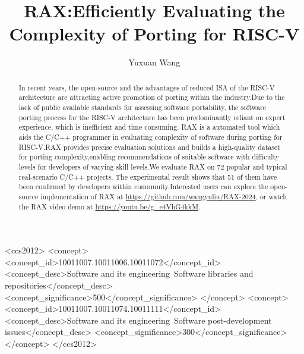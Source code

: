 \documentclass[sigconf,screen,review,anonymous]{acmart}
\begin{document}
\title{RAX:Efficiently Evaluating the Complexity of Porting for RISC-V}

\author{Yuxuan Wang}

\renewcommand{\shortauthors}{Yuxuan et al.}

\begin{abstract}
  In recent years, the open-source and the advantages of reduced ISA of the RISC-V architecture are attracting active promotion of porting within the industry.Due to the lack of public available standards for assessing software portability, the software porting process for the RISC-V architecture has been predominantly reliant on expert experience, which is inefficient and time consuming. RAX is a automated tool which aids the C/C++ programmer in evaluating  complexity of software during porting for RISC-V.RAX provides precise evaluation solutions and builds a high-quality dataset for porting complexity,enabling recommendations of suitable software with difficulty levels for developers of varying skill levels.We evaluate RAX on 72 popular and typical real-scenario C/C++ projects. The experimental result shows that 51 of them have been confirmed by developers within community.Interested users can explore the open-source implementation of RAX at \href{https://github.com/wangyuliu/RAX-2024}{https://github.com/wangyuliu/RAX-2024}, or watch the RAX video demo at \href{https://youtu.be/g_e4VhG4kkM}{https://youtu.be/g_e4VhG4kkM}.
\end{abstract}

\begin{CCSXML}
<ccs2012>
    <concept>
        <concept_id>10011007.10011006.10011072</concept_id>
        <concept_desc>Software and its engineering~Software libraries and repositories</concept_desc>
        <concept_significance>500</concept_significance>
        </concept>
    <concept>
        <concept_id>10011007.10011074.10011111</concept_id>
        <concept_desc>Software and its engineering~Software post-development issues</concept_desc>
        <concept_significance>300</concept_significance>
    </concept>
</ccs2012>
\end{CCSXML}
  
\end{document}
